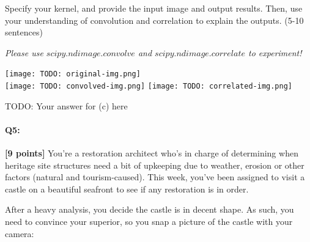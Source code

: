 \begin{enumerate}[(a)]
\begin{tcolorbox}[colback=orange!5!white,colframe=orange!75!black]
    Specify your kernel, and provide the input image and output results. Then, use your understanding of convolution and correlation to explain the outputs. (5-10 sentences)
    \end{tcolorbox}
    
    \emph{Please use \href{https://docs.scipy.org/doc/scipy/reference/generated/scipy.ndimage.convolve.html}{$scipy.ndimage.convolve$} and \href{https://docs.scipy.org/doc/scipy/reference/generated/scipy.ndimage.correlate.html}{$scipy.ndimage.correlate$} to experiment!}
    

    \texttt{[image: TODO: original-img.png]}\\
    \texttt{[image: TODO: convolved-img.png]}
    \texttt{[image: TODO: correlated-img.png]}
    

    \begin{mdframed}
        TODO: Your answer for (c) here
    \end{mdframed}

\end{enumerate}





\pagebreak

\paragraph{Q5:} \textbf{[9 points]} You're a restoration architect who's in charge of determining when heritage site structures need a bit of upkeeping due to weather, erosion or other factors (natural and tourism-caused). This week, you've been assigned to visit a castle on a beautiful seafront to see if any restoration is in order.

After a heavy analysis, you decide the castle is in decent shape. As such, you need to convince your superior, so you snap a picture of the castle with your camera:

